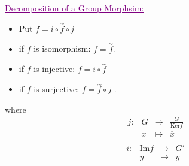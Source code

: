 \noindent
\textcolor{purple}{
\underline{
Decomposition of a Group Morphsim:
}
}\\
\begin{center}
\end{center}
\begin{itemize}
  \item Put $f = i \circ \overset{\sim}{f} \circ j $ 
    \item if $f $ is isomorphism: $f = \overset{\sim}{f}.  $  
      \item if $f $ is injective: $f = i \circ \overset{\sim}{f}  $ 
        \item  if $f $ is surjective: $f = \overset{\sim}{f}  \circ  j $ .
\end{itemize}
where \[
\begin{array}{cccc}
      j : &  G  & \longrightarrow & \frac{G}{\text{Ker}  f} \\

           &  x  & \longmapsto     & \overline{x} \\ 
\end{array}
\]
\[
\begin{array}{cccc}
      i : &  \text{Im}  f  & \longrightarrow & G' \\

           &  y  & \longmapsto     & y \\ 
\end{array}
\]

